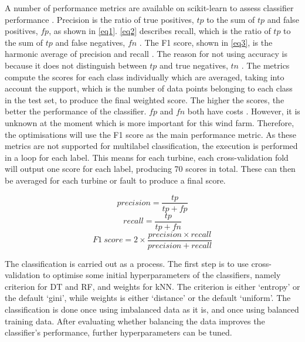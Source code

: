 A number of performance metrics are available on scikit-learn to assess classifier performance \cite{33M}. Precision is the ratio of true positives, \ensuremath{tp} to the sum of \ensuremath{tp} and false positives, \ensuremath{fp}, as shown in \eqref{eq1}. \eqref{eq2} describes recall, which is the ratio of \ensuremath{tp} to the sum of \ensuremath{tp} and false negatives, \ensuremath{fn} \cite{deRu15}. The F1 score, shown in \eqref{eq3}, is the harmonic average of precision and recall \cite{Perfo}. The reason for not using accuracy is because it does not distinguish between \ensuremath{tp} and true negatives, \ensuremath{tn} \cite{Perfo,SASH}. The metrics compute the scores for each class individually which are averaged, taking into account the support, which is the number of data points belonging to each class in the test set, to produce the final weighted score. The higher the scores, the better the performance of the classifier. \ensuremath{fp} and \ensuremath{fn} both have costs \cite{Perfo}. However, it is unknown at the moment which is more important for this wind farm. Therefore, the optimisations will use the F1 score as the main performance metric. As these metrics are not supported for multilabel classification, the execution is performed in a loop for each label. This means for each turbine, each cross-validation fold will output one score for each label, producing 70 scores in total. These can then be averaged for each turbine or fault to produce a final score.

\begin{equation}
  \label{eq1}
  precision = \frac{tp}{tp + fp}
\end{equation}
\begin{equation}
  \label{eq2}
  recall = \frac{tp}{tp + fn}
\end{equation}
\begin{equation}
  \label{eq3}
  F1~score = 2 \times \frac{precision \times recall}{precision + recall}
\end{equation}

The classification is carried out as a process. The first step is to use cross-validation to optimise some initial hyperparameters of the classifiers, namely criterion for DT and RF, and weights for kNN. The criterion is either `entropy' or the default `gini', while weights is either `distance' or the default `uniform'. The classification is done once using imbalanced data as it is, and once using balanced training data. After evaluating whether balancing the data improves the classifier's performance, further hyperparameters can be tuned.
